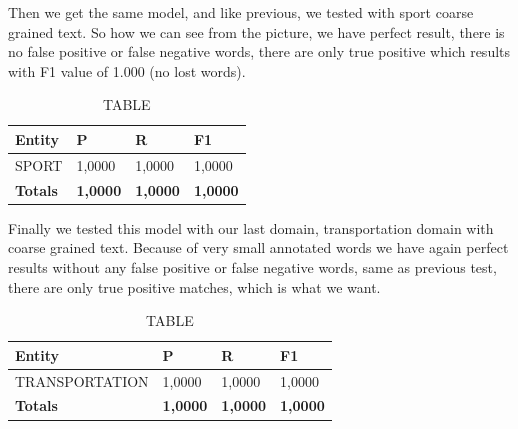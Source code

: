 \documentclass[thesis=M,english]{FITthesis}[2018/05/30]
\begin{document}
	Then we get the same model, and like previous, we tested with sport coarse grained text. So how we can see from the picture, we have perfect result, there is no false positive or false negative words, there are only true positive which results with F1 value of 1.000 (no lost words).
	\begin{table}[H]\centering
		\caption{TABLE}
		\label{}
		\begin{tabular}{|l|l|l|l|}
			\hline {\textbf{Entity}} & {\textbf{P}} & {\textbf{R}} & {\textbf{F1}}\\\hline
				SPORT & 1,0000 & 1,0000 & 1,0000\\\hline
				\textbf{Totals} & \textbf{1,0000} & \textbf{1,0000} & \textbf{1,0000}\\\hline
		\end{tabular}
	\end{table}	

	Finally we tested this model with our last domain, transportation domain with coarse grained text.	Because of very small annotated words we have again perfect results without any false positive or false negative words, same as previous test, there are only true positive matches, which is what we want.
	\begin{table}[H]\centering
		\caption{TABLE}
		\label{}
		\begin{tabular}{|l|l|l|l|}
			\hline {\textbf{Entity}} & {\textbf{P}} & {\textbf{R}} & {\textbf{F1}}\\\hline
				TRANSPORTATION & 1,0000 & 1,0000 & 1,0000\\\hline
				\textbf{Totals} & \textbf{1,0000} & \textbf{1,0000} & \textbf{1,0000}\\\hline
		\end{tabular}
	\end{table}
\end{document}
